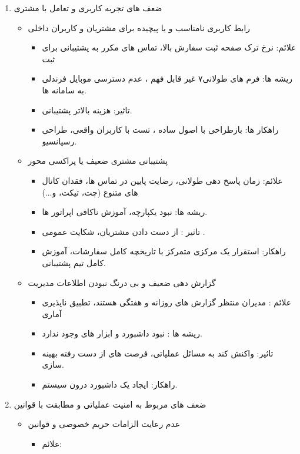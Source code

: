 \documentclass[12pt,a4paper]{report}
\begin{document}
\begin{enumerate}
\begin{itemize}
\end{itemize}
\item ضعف های تجربه کاربری  و تعامل با مشتری
\begin{itemize}
	\item رابط کاربری نامناسب و یا پیچیده برای مشتریان و کاربران داخلی
	\begin{itemize}
		\item علائم:
نرخ ترک صفحه ثبت سفارش بالا، تماس های مکرر به پشتیبانی برای ثبت 
		\item ریشه ها:
فرم های طولانی۷  غیر قابل فهم ، عدم دسترسی موبایل فرندلی به سامانه ها.
		\item تاثیر: 
	هزینه بالاتر پشتیبانی. 
		\item راهکار ها:
بازطراحی  با اصول ساده ، تست با کاربران واقعی، طراحی رسپانسیو.
	\end{itemize}
	\newpage
	\item پشتیبانی مشتری ضعیف یا پراکسی محور
	\begin{itemize}
		\item علائم:
زمان پاسخ دهی طولانی، رضایت پایین در تماس ها،  فقدان کانال های متنوع (چت، تیکت، و...)
		\item  ریشه ها:
نبود  یکپارچه، آموزش ناکافی اپراتور ها.
		\item تاثیر :
از دست دادن مشتریان، شکایت عمومی .
		\item راهکار:
استقرار یک  مرکزی متمرکز با تاریخچه کامل سفارشات، آموزش کامل تیم پشتیبانی.
	\end{itemize}
	\item گزارش دهی ضعیف و بی درنگ نبودن اطلاعات مدیریت
	\begin{itemize}
		\item علائم :
مدیران منتظر گزارش های روزانه و هفتگی هستند، تطبیق ناپذیری آماری
		\item ریشه ها :
نبود داشبورد  و ابزار های  وجود ندارد.
		\item تاثیر: 
واکنش کند به مسائل عملیاتی، فرصت های از دست رفته بهینه سازی.
		\item راهکار:
		ایجاد یک داشبورد   درون سیستم.
	\end{itemize}
\end{itemize}
\item ضعف های مربوط به امنیت عملیاتی و مطابقت با قوانین
\begin{itemize}
	\item عدم رعایت الزامات حریم خصوصی و قوانین
	\begin{itemize}
		\item علائم:

\end{itemize}
\end{itemize}
\end{enumerate}
\end{document}
